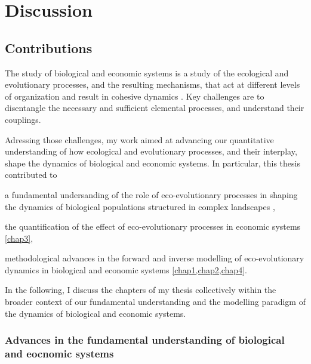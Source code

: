 %
\newcommand{\chapi}{\cref{diff-in-graphs}}
\newcommand{\chapii}{\cref{diff-in-graphs}}
\newcommand{\chapiii}{\cref{diff-in-graphs}}
\newcommand{\chapiv}{\cref{diff-in-graphs}}
\graphicspath{{./content/conclusion/fig/}}

\chapter{Discussion}
\label{sec:conclusion}



\section{Contributions}
The study of biological and economic systems is a study of the ecological and evolutionary processes, and the resulting mechanisms, that act at different levels of organization and result in cohesive dynamics \cite{Levin2002}.
% 
Key challenges are to disentangle the necessary and sufficient elemental processes, and understand their couplings. 

Adressing those challenges, my work aimed at advancing our quantitative understanding of how ecological and evolutionary processes, and their interplay, shape the dynamics of biological and economic systems. In particular, this thesis contributed to 
% 
\begin{mylisti}
    \item a fundamental undersanding of the role of eco-evolutionary processes in shaping the dynamics of biological populations structured in complex landscapes \cite{chap1},
    \item the quantification of the effect of eco-evolutionary processes in economic systems \cref{chap3},
    \item methodological advances in the forward and inverse modelling of eco-evolutionary dynamics in biological and economic systems \cref{chap1,chap2,chap4}.
\end{mylisti}

In the following, I discuss the chapters of my thesis collectively within the broader context of our fundamental understanding and the modelling paradigm of the dynamics of biological and economic systems.

\subsection{Advances in the fundamental understanding of biological and eocnomic systems}

